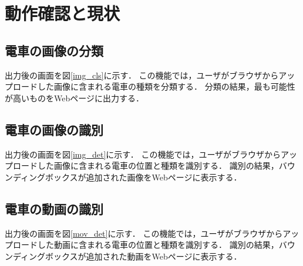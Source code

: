 \section{動作確認と現状}
\subsection{電車の画像の分類} 
出力後の画面を図\ref{img_cls}に示す．
この機能では，ユーザがブラウザからアップロードした画像に含まれる電車の種類を分類する． 分類の結果，最も可能性が高いものをWebページに出力する．
\subsection{電車の画像の識別}
出力後の画面を図\ref{img_det}に示す．
この機能では，ユーザがブラウザからアップロードした画像に含まれる電車の位置と種類を識別する．  識別の結果，バウンディングボックスが追加された画像をWebページに表示する．
\subsection{電車の動画の識別} 
出力後の画面を図\ref{mov_det}に示す．
この機能では，ユーザがブラウザからアップロードした動画に含まれる電車の位置と種類を識別する． 識別の結果，バウンディングボックスが追加された動画をWebページに表示する．



